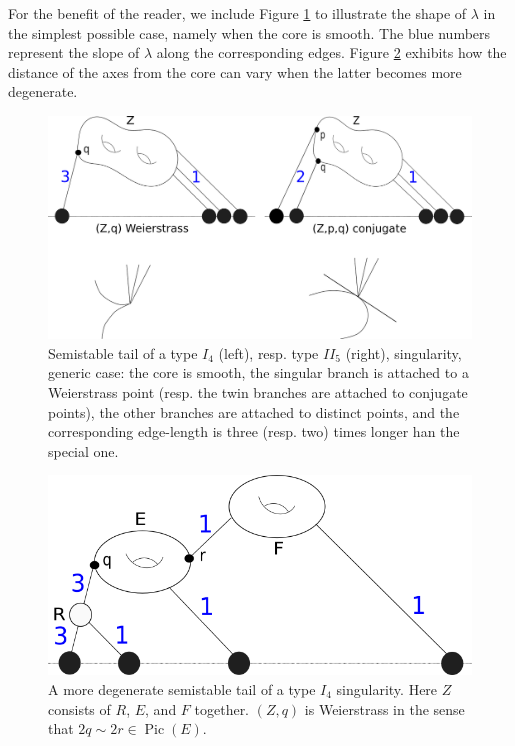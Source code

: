 \documentclass{compositio}
\theoremstyle{plain}
\theoremstyle{definition}
\theoremstyle{remark}
\begin{document}
 
  For the benefit of the reader, we include Figure \ref{fig:adm_fun_smooth_core} to illustrate the shape of $\lambda$ in the simplest possible case, namely when the core is smooth. The blue numbers represent the slope of $\lambda$ along the corresponding edges. Figure \ref{fig:adm_fun_reducible_core} exhibits how the distance of the axes from the core can vary when the latter becomes more degenerate.
 
 
  \begin{figure}[htb]
  \centering
  \includegraphics[width=.8\textwidth]{irreducible_core}
  \caption{Semistable tail of a type $I_4$ (left), resp. type $I\!I_5$ (right), singularity, generic case: the core is smooth, the singular branch is attached to a Weierstrass point (resp. the twin branches are attached to conjugate points), the other branches are attached to distinct points, and the corresponding edge-length is three (resp. two) times longer han the special one.}
  \label{fig:adm_fun_smooth_core}
 \end{figure}
 
 
  
  \begin{figure}[htb]
  \centering
  \includegraphics[width=.7\textwidth]{reducible_core}
  \caption{A more degenerate semistable tail of a type $I_4$ singularity. Here $Z$ consists of $R$, $E$, and $F$ together. $(Z,q)$ is Weierstrass in the sense that $2q\sim 2r\in\operatorname{Pic}(E)$.}
  \label{fig:adm_fun_reducible_core}
 \end{figure}
\end{document}
